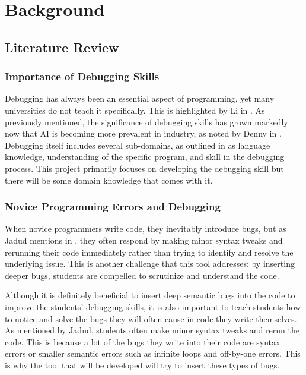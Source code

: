 \documentclass[12pt]{extarticle}
\begin{document}
\section{Background}

\subsection{Literature Review}

\subsubsection{Importance of Debugging Skills}

Debugging has always been an essential aspect of programming, yet many universities do not teach it specifically. This is highlighted by Li in \cite{li2019}. As previously mentioned, the significance of debugging skills has grown markedly now that AI is becoming more prevalent in industry, as noted by Denny in \cite{denny2024}. Debugging itself includes several sub-domains, as outlined in \cite{li2019} as language knowledge, understanding of the specific program, and skill in the debugging process. This project primarily focuses on developing the debugging skill but there will be some domain knowledge that comes with it.

\subsubsection{Novice Programming Errors and Debugging}

When novice programmers write code, they inevitably introduce bugs, but as Jadud mentions in \cite{jadud2006}, they often respond by making minor syntax tweaks and rerunning their code immediately rather than trying to identify and resolve the underlying issue. This is another challenge that this tool addresses: by inserting deeper bugs, students are compelled to scrutinize and understand the code.

Although it is definitely beneficial to insert deep semantic bugs into the code to improve the students' debugging skills, it is also important to teach students how to notice and solve the bugs they will often cause in code they write themselves. As mentioned by Jadud, students often make minor syntax tweaks and rerun the code. This is because a lot of the bugs they write into their code are syntax errors or smaller semantic errors such as infinite loops and off-by-one errors. This is why the tool that will be developed will try to insert these types of bugs.
\end{document}
